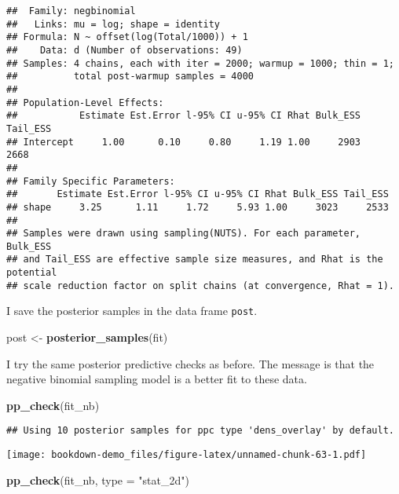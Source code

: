 \documentclass[
]{book}
\newenvironment{Shaded}{\begin{snugshade}}{\end{snugshade}}
\newcommand{\DataTypeTok}[1]{\textcolor[rgb]{0.13,0.29,0.53}{#1}}
\newcommand{\KeywordTok}[1]{\textcolor[rgb]{0.13,0.29,0.53}{\textbf{#1}}}
\newcommand{\NormalTok}[1]{#1}
\newcommand{\StringTok}[1]{\textcolor[rgb]{0.31,0.60,0.02}{#1}}
\begin{document}
\begin{verbatim}
##  Family: negbinomial 
##   Links: mu = log; shape = identity 
## Formula: N ~ offset(log(Total/1000)) + 1 
##    Data: d (Number of observations: 49) 
## Samples: 4 chains, each with iter = 2000; warmup = 1000; thin = 1;
##          total post-warmup samples = 4000
## 
## Population-Level Effects: 
##           Estimate Est.Error l-95% CI u-95% CI Rhat Bulk_ESS Tail_ESS
## Intercept     1.00      0.10     0.80     1.19 1.00     2903     2668
## 
## Family Specific Parameters: 
##       Estimate Est.Error l-95% CI u-95% CI Rhat Bulk_ESS Tail_ESS
## shape     3.25      1.11     1.72     5.93 1.00     3023     2533
## 
## Samples were drawn using sampling(NUTS). For each parameter, Bulk_ESS
## and Tail_ESS are effective sample size measures, and Rhat is the potential
## scale reduction factor on split chains (at convergence, Rhat = 1).
\end{verbatim}

I save the posterior samples in the data frame \texttt{post}.

\begin{Shaded}
\begin{Highlighting}[]
\NormalTok{post <-}\StringTok{ }\KeywordTok{posterior_samples}\NormalTok{(fit)}
\end{Highlighting}
\end{Shaded}

I try the same posterior predictive checks as before. The message is that the negative binomial sampling model is a better fit to these data.

\begin{Shaded}
\begin{Highlighting}[]
\KeywordTok{pp_check}\NormalTok{(fit_nb)}
\end{Highlighting}
\end{Shaded}

\begin{verbatim}
## Using 10 posterior samples for ppc type 'dens_overlay' by default.
\end{verbatim}

\texttt{[image: bookdown-demo\_files/figure-latex/unnamed-chunk-63-1.pdf]}

\begin{Shaded}
\begin{Highlighting}[]
\KeywordTok{pp_check}\NormalTok{(fit_nb, }\DataTypeTok{type =} \StringTok{"stat_2d"}\NormalTok{)}
\end{Highlighting}
\end{Shaded}
\end{document}
